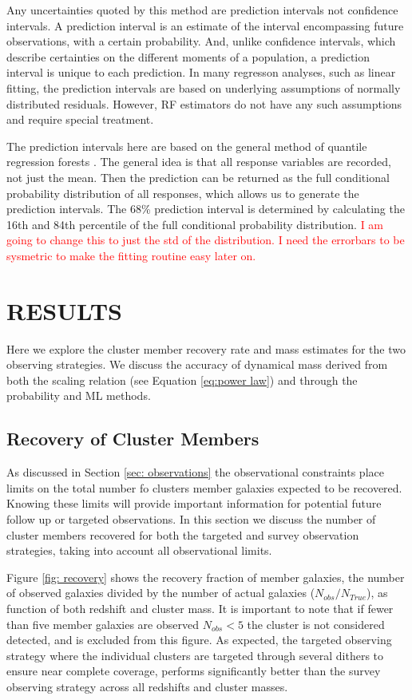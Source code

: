 \documentclass[fleqn,usenatbib]{mnras}
\newcommand{\editorial}[1]{\textcolor{red}{#1}}
\begin{document}
Any uncertainties quoted by this method are prediction intervals not confidence intervals. A prediction interval is an estimate of the interval encompassing future observations, with a certain probability. And, unlike confidence intervals, which describe certainties on the different moments of a population, a prediction interval is unique to each prediction. In many regresson analyses, such as linear fitting, the prediction intervals are based on underlying assumptions of normally distributed residuals. However, RF estimators do not have any such assumptions and require special treatment.

The prediction intervals here are based on the general method of quantile regression forests \citep{Meinshausen2006}. The general idea is that all response variables are recorded, not just the mean. Then the prediction can be returned as the full conditional probability distribution of all responses, which allows us to generate the prediction intervals. The 68\% prediction interval is determined by calculating the 16th and 84th percentile of the full conditional probability distribution. \editorial{I am going to change this to just the std of the distribution. I need the errorbars to be sysmetric to make the fitting routine easy later on.}

\section{RESULTS}\label{sec:results}
Here we explore the cluster member recovery rate and mass estimates for the two observing strategies. We discuss the accuracy of dynamical mass derived from both the scaling relation (see Equation \ref{eq:power law}) and through the probability and ML methods.

\subsection{Recovery of Cluster Members}
As discussed in Section \ref{sec: observations} the observational constraints place limits on the total number fo clusters member galaxies expected to be recovered. Knowing these limits will provide important information for potential future follow up or targeted observations. In this section we discuss the number of cluster members recovered for both the targeted and survey observation strategies, taking into account all observational limits.

Figure \ref{fig: recovery} shows the recovery fraction of member galaxies, the number of observed galaxies divided by the number of actual galaxies ($N_{obs}/N_{True}$), as function of both redshift and cluster mass. It is important to note that if fewer than five member galaxies are observed $N_{obs} <5$ the cluster is not considered detected, and is excluded from this figure. As expected, the targeted observing strategy where the individual clusters are targeted through several dithers to ensure near complete coverage, performs significantly better than the survey observing strategy across all redshifts and cluster masses. 
\end{document}
